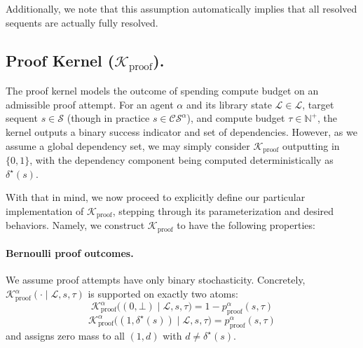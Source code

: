 Additionally, we note that this assumption automatically implies that all resolved sequents are actually fully resolved.%



\subsection{Proof Kernel ($\mathcal{K}_{\text{proof}}$).}
The proof kernel models the outcome of spending compute budget on an admissible proof attempt. For an agent $\alpha$ and its library state $\mathcal{L}\in\mathscr{L}$, target sequent $s\in\mathcal S$ (though in practice $s \in \mathcal{CS}^{\alpha}$), and compute budget $\tau\in\mathbb N^+$, the kernel outputs a binary success indicator and set of dependencies. However, as we assume a global dependency set, we may simply consider $\mathcal{K}_{\text{proof}}$ outputting in $\{0,1\}$, with the dependency component being computed deterministically as $\delta^\star(s)$.

With that in mind, we now proceed to explicitly define our particular implementation of $\mathcal{K}_{\text{proof}}$, stepping through its parameterization and desired behaviors. Namely, we construct $\mathcal{K}_{\text{proof}}$ to have the following properties:

\paragraph{Bernoulli proof outcomes.}
We assume proof attempts have only binary stochasticity. Concretely, $\mathcal K^\alpha_{\mathrm{proof}}(\cdot\mid \mathcal{L}, s,\tau)$ is supported on exactly two atoms:
\[
\mathcal K^\alpha_{\mathrm{proof}}\big((0,\bot)\mid \mathcal{L}, s,\tau\big)=1-p^\alpha_{\mathrm{proof}}(s,\tau)\]
\[\mathcal K^\alpha_{\mathrm{proof}}\big((1,\delta^\star(s))\mid \mathcal{L}, s,\tau\big)=p^\alpha_{\mathrm{proof}}(s,\tau)
\]
and assigns zero mass to all $(1,d)$ with $d\neq \delta^\star(s)$.

